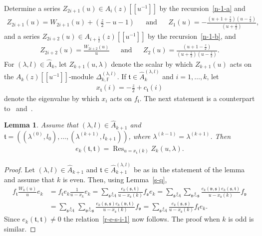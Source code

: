 \documentclass[11pt,a4paper,reqno,svgnames]{amsart}
\theoremstyle{plain}
\newtheorem{lemma}[theorem]{Lemma}
\theoremstyle{definition}
\numberwithin{equation}{section}
\begin{document}
Determine a series $Z_{2i+1}(u)\in A_{i}(z)[[u^{-1}]]$ by the recursion~\eqref{n-1-a} and 
\begin{align}\label{n-2-a}
Z_{2i+1}(u)=W_{2i+1}(u)+(\textstyle\frac{z}{2}-u-1)
&&\text{and}&&Z_1(u)=-\frac{(u+1+\textstyle\frac{z}{2})(u-\textstyle\frac{z}{2})}{(u+\textstyle\frac{z}{2})},
\end{align}
and a series $Z_{2i+2}(u)\in A_{i+{\frac{1}{2}}}(z)[[u^{-1}]]$ by the recursion~\eqref{n-1-b}, and
\begin{align}\label{n-2-b}
Z_{2i+2}(u)=\frac{W_{2i+2}(u)}{u}
&&\text{and}&&
{Z_2(u)}=\frac{(u+1-\textstyle\frac{z}{2})}{(u+\textstyle\frac{z}{2})(u-\textstyle\frac{z}{2})}.
\end{align}
For $(\lambda,l)\in\hat{A}_{k}$, let $Z_{k+1}(u,\lambda)$ denote the scalar by which $Z_{k+1}(u)$ acts on the $A_{k}(z)[[u^{-1}]]$-module $\Delta^{(\lambda,l)}_{k,\mathbb{F}}$. 
If $\mathfrak{t}\in\hat{A}_k^{(\lambda,l)}$ and $i=1,\ldots,k$, let 
\begin{align*}
x_\mathfrak{t}(i)=-{\textstyle\frac{z}{2}}+c_\mathfrak{t}(i)
\end{align*}
denote the eigenvalue by which $x_i$ acts on $f_\mathfrak{t}$. The next statement is a counterpart to~\cite[(3.6)]{MR1398116} and~\cite[Lemma~7.4]{MR1866492}. 
\begin{lemma}\label{r-e-s-i}
Assume that $(\lambda, l )\in\hat{A}_{k+1}$ and $\mathfrak{t}=((\lambda^{(0)},l_0),\ldots,(\lambda^{(k+1)},l_{k+1}))$, where $\lambda^{(k-1)}=\lambda^{(k+1)}$. Then 
\begin{align}\label{r-e-s-i-1} 
e_{k}(\mathfrak{t},\mathfrak{t})=\operatorname{Res}_{u=x_\mathfrak{t}(k)}Z_{k}(u,\lambda).
\end{align}
\end{lemma}
\begin{proof}
Let $(\lambda, l )\in\hat{A}_{k+1}$ and $\mathfrak{t}\in\hat{A}_{k+1}^{(\lambda,l)}$ be as in the statement of the lemma and assume that $k$ is even. Then, using Lemma~\ref{s-q},
\begin{align*}
f_\mathfrak{t}\frac{W_{k}(u)}{u}e_{k}
&=f_\mathfrak{t}e_{k}\frac{1}{u-x_{k}}e_{k} 
=\sum_{\mathfrak{s}\stackrel{k}{\sim}\mathfrak{t}}
\frac{e_{k}(\mathfrak{s},\mathfrak{t})}{u-x_\mathfrak{s}(k)}f_\mathfrak{s}e_{k}
=\sum_{\mathfrak{s}\stackrel{k}{\sim}\mathfrak{t}}
\sum_{\mathfrak{v}\stackrel{k}{\sim}\mathfrak{s}}
\frac{e_{k}(\mathfrak{v},\mathfrak{s})e_{k}(\mathfrak{s},\mathfrak{t})}{u-x_\mathfrak{s}(k)}f_\mathfrak{v}\\
&=\sum_{\mathfrak{s}\stackrel{k}{\sim}\mathfrak{t}}\,
\sum_{\mathfrak{v}\stackrel{k}{\sim}\mathfrak{s}}
\frac{e_{k}(\mathfrak{s},\mathfrak{s})e_{k}(\mathfrak{v},\mathfrak{t})}{u-x_\mathfrak{s}(k)}f_\mathfrak{v}
=\sum_{\mathfrak{s}\stackrel{k}{\sim}\mathfrak{t}}
\frac{e_{k}(\mathfrak{s},\mathfrak{s})}{u-x_\mathfrak{s}(k)}f_\mathfrak{t}e_{k}. 
\end{align*}
Since $e_{k}(\mathfrak{t},\mathfrak{t})\ne0$ the relation~\eqref{r-e-s-i-1} now follows. The proof when $k$ is odd is similar.
\end{proof}
\end{document}
